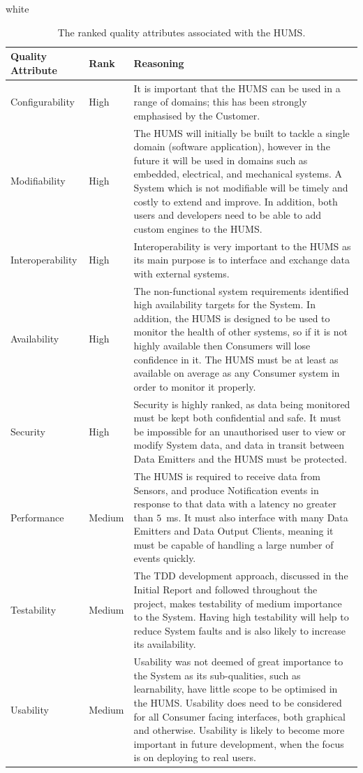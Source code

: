 \documentclass[10pt,a4paper]{article}
\newcommand{\tableformat}[4]{
\begin{table}[ht!]
\centering
  \rowcolors{2}{gray!10} {white}
\def\arraystretch{1.5}
\begin{tabularx}{\textwidth}{#1}
  \hline
  \rowcolor[gray]{0.9} #2
  \hline
\end{tabularx}
\caption{#3}
\label{#4}
\end{table}}
\begin{document}
\tableformat{ p{2.4cm} p{1.2cm} X }{
\hline
Quality \newline Attribute & Rank & Reasoning \\
\hline
Configurability & High & It is important that the HUMS can be used in a range of domains; this has been strongly emphasised by the Customer. 
\\
Modifiability & High & The HUMS will initially be built to tackle a single domain (software application), however in the future it will be used in domains such as embedded, electrical, and mechanical systems. A System which is not modifiable will be timely and costly to extend and improve. In addition, both users and developers need to be able to add custom engines to the HUMS.
\\
Interoperability & High & Interoperability is very important to the HUMS as its main purpose is to interface and exchange data with external systems.
\\
Availability & High & The non-functional system requirements identified high availability targets for the System. In addition, the HUMS is designed to be used to monitor the health of other systems, so if it is not highly available then Consumers will lose confidence in it. The HUMS must be at least as available on average as any Consumer system in order to monitor it properly.
\\
Security & High & Security is highly ranked, as data being monitored must be kept both confidential and safe. It must be impossible for an unauthorised user to view or modify System data, and data in transit between Data Emitters and the HUMS must be protected.
\\
Performance & Medium & The HUMS is required to receive data from Sensors, and produce Notification events in response to that data with a latency no greater than $5$~ms. It must also interface with many Data Emitters and Data Output Clients, meaning it must be capable of handling a large number of events quickly.
\\
Testability & Medium & The TDD development approach, discussed in the Initial Report and followed throughout the project, makes testability of medium importance to the System. Having high testability will help to reduce System faults and is also likely to increase its availability.
\\
Usability & Medium & Usability was not deemed of great importance to the System as its sub-qualities, such as learnability, have little scope to be optimised in the HUMS. Usability does need to be considered for all Consumer facing interfaces, both graphical and otherwise. Usability is likely to become more important in future development, when the focus is on deploying to real users.
\\
}{The ranked quality attributes associated with the HUMS.}{tab:qualities}
\end{document}
